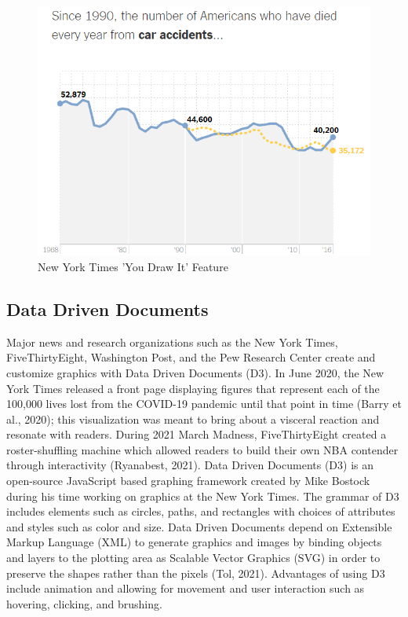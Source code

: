 \documentclass[print]{nuthesis}
\begin{document}
\begin{figure}[tbp]

{\centering \includegraphics[width=0.75\linewidth,]{images/02-you-draw-it/nyt-caraccidents-frame4} 

}

\caption{New York Times 'You Draw It' Feature}\label{fig:nyt-caraccidents}
\end{figure}

\hypertarget{data-driven-documents}{%
\subsection{Data Driven Documents}\label{data-driven-documents}}

Major news and research organizations such as the New York Times, FiveThirtyEight, Washington Post, and the Pew Research Center create and customize graphics with Data Driven Documents (D3).
In June 2020, the New York Times released a front page displaying figures that represent each of the 100,000 lives lost from the COVID-19 pandemic until that point in time (Barry et al., 2020); this visualization was meant to bring about a visceral reaction and resonate with readers.
During 2021 March Madness, FiveThirtyEight created a roster-shuffling machine which allowed readers to build their own NBA contender through interactivity (Ryanabest, 2021).
Data Driven Documents (D3) is an open-source JavaScript based graphing framework created by Mike Bostock during his time working on graphics at the New York Times.
The grammar of D3 includes elements such as circles, paths, and rectangles with choices of attributes and styles such as color and size.
Data Driven Documents depend on Extensible Markup Language (XML) to generate graphics and images by binding objects and layers to the plotting area as Scalable Vector Graphics (SVG) in order to preserve the shapes rather than the pixels  (Tol, 2021).
Advantages of using D3 include animation and allowing for movement and user interaction such as hovering, clicking, and brushing.
\end{document}
